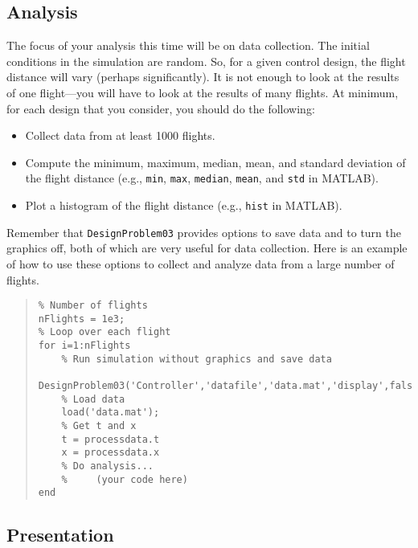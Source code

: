 \documentclass[12pt]{article}
\begin{document}
\subsection{Analysis}
\label{secAnalysis}

The focus of your analysis this time will be on data collection. The initial conditions in the simulation are random. So, for a given control design, the flight distance will vary (perhaps significantly). It is not enough to look at the results of one flight---you will have to look at the results of many flights. At minimum, for each design that you consider, you should do the following:
\begin{itemize}
\item Collect data from at least 1000 flights.
\item Compute the minimum, maximum, median, mean, and standard deviation of the flight distance (e.g., \lstinline|min|, \lstinline|max|, \lstinline|median|, \lstinline|mean|, and \lstinline|std| in MATLAB).
\item Plot a histogram of the flight distance (e.g., \lstinline|hist| in MATLAB).
\end{itemize}
Remember that \lstinline|DesignProblem03| provides options to save data and to turn the graphics off, both of which are very useful for data collection. Here is an example of how to use these options to collect and analyze data from a large number of flights.
\begin{quote}
\begin{lstlisting}
% Number of flights
nFlights = 1e3;
% Loop over each flight
for i=1:nFlights
    % Run simulation without graphics and save data
    DesignProblem03('Controller','datafile','data.mat','display',false);
    % Load data
    load('data.mat');
    % Get t and x
    t = processdata.t
    x = processdata.x
    % Do analysis...
    %     (your code here)
end
\end{lstlisting}
\end{quote}


\subsection{Presentation}
\end{document}
